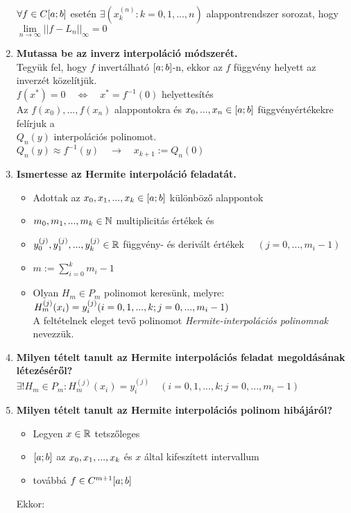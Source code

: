 \documentclass{article}
\begin{document}
\begin{enumerate}
	$\forall f\in C[a;b]$ esetén $\exists(x_k^{(n)}:k=0,1,...,n)$ alappontrendszer
	sorozat, hogy $\lim\limits_{n\to\infty}||f-L_n||_{\infty}=0$
	\item\textbf{Mutassa be az inverz interpoláció módszerét.}\\[0.1cm]
	Tegyük fel, hogy $f$ invertálható $[a;b]$-n, ekkor az $f$ 
	függvény helyett az inverzét közelítjük.\\[0.1cm]
	{\large $f(x^*)=0\quad\Leftrightarrow\quad x^*=f^{-1}(0)$} helyettesítés\\[0.1cm]
	Az $f(x_0),...,f(x_n)$ alappontokra és $x_0,...,x_n\in[a;b]$ függvényértékekre
	felírjuk a \\ $Q_n(y)$ interpolációs polinomot.\\[0.1cm]
	{\Large $Q_n(y)\approx f^{-1}(y)\quad\to\quad x_{k+1}:=Q_n(0)$}
	\item\textbf{Ismertesse az Hermite interpoláció feladatát.}
	\begin{itemize}
		\item Adottak az $x_0,x_1,...,x_k\in[a;b]$ különböző alappontok
		\item $m_0,m_1,...,m_k\in\mathbb{N}$ multiplicitás értékek és
		\item $y_0^{(j)},y_1^{(j)},...,y_k^{(j)}\in\mathbb{R}$ függvény- és derivált értékek
		$\quad(j=0,...,m_i-1)$
		\item $m:=\sum\limits_{i=0}^km_i-1$
		\item Olyan $H_m\in P_m$ polinomot keresünk, melyre: $H_m^{(j)}(x_i)=y_i^{(j)}
		\\[0.1cm](i=0,1,...,k;j=0,...,m_i-1)$\\[0.1cm]
		A feltételnek eleget tevő polinomot \textit{Hermite-interpolációs polinomnak}
		nevezzük.
	\end{itemize}
	\newpage
	\item\textbf{Milyen tételt tanult az Hermite interpolációs feladat megoldásának létezéséről?}\\[0.2cm]
	$\exists!H_m\in P_m:H_m^{(j)}(x_i)=y_i^{(j)}\quad(i=0,1,...,k;j=0,...,m_i-1)$
	\item\textbf{Milyen tételt tanult az Hermite interpolációs polinom hibájáról?}
	\begin{itemize}
		\item Legyen $x\in\mathbb{R}$ tetszőleges
		\item $[a;b]$ az $x_0,x_1,...,x_k$ és $x$ által kifeszített intervallum
		\item továbbá $f\in C^{m+1}[a;b]$
	\end{itemize}
	Ekkor:
	\begin{itemize}

\end{itemize}
\end{enumerate}
\end{document}
